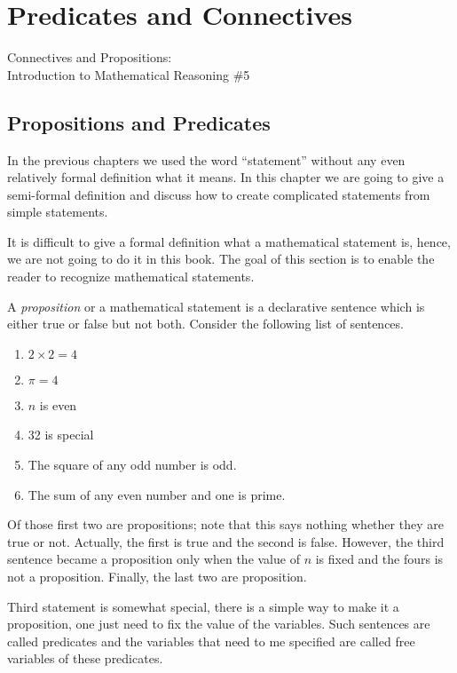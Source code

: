 \chapter{Predicates and Connectives}
\begin{marginfigure}
  {\scriptsize Connectives and Propositions:\\\noindent
  Introduction to Mathematical Reasoning \#5}
  \vskip 0.25cm
  \noindent
  \vskip 0.25cm
  \noindent
\end{marginfigure}
\section{Propositions and Predicates}
In the previous chapters we used the word ``statement'' without any even
relatively formal definition what it means. In this chapter we are going to
give a semi-formal definition and discuss how to create complicated statements
from simple statements.

It is difficult to give a formal definition what a mathematical statement is,
hence, we are not going to do it in this book. The goal of this section is to
enable the reader to recognize mathematical statements.

A \textit{proposition} or a mathematical statement is a declarative sentence
which is either true or false but not both. Consider the following list of
sentences.
\begin{enumerate}
  \item $2 \times 2 = 4$
  \item $\pi = 4$
  \item $n$ is even
  \item 32 is special
  \item The square of any odd number is odd.
  \item The sum of any even number and one is prime.
\end{enumerate}
Of those first two are propositions; note that this says nothing whether they
are true or not. Actually, the first is true and the second is false.
However, the third sentence became a proposition only when the value
of $n$ is fixed and the fours is not a proposition. Finally, the last
two are proposition.

Third statement is somewhat special, there is a simple way to make it a
proposition, one just need to fix the value of the variables. Such sentences
are called predicates and the variables that need to me specified are called
free variables of these predicates.


